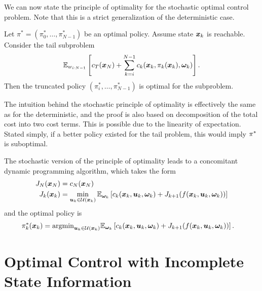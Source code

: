 We can now state the principle of optimality for the stochastic optimal control problem. Note that this is a strict generalization of the deterministic case. 

\begin{theorem}
Let $\pi^* = (\pi_0^*, \ldots, \pi^*_{N-1})$ be an optimal policy. Assume state $\bm{x}_k$ is reachable. Consider the tail subproblem
\begin{equation}
\mathbb{E}_{w_{i:N-1}}\left[ c_T(\bm{x}_N) + \sum_{k=i}^{N-1} c_k(\bm{x}_k,\pi_k(\bm{x}_k),\bm{\omega}_k) \right].
\end{equation}
Then the truncated policy $(\pi_i^*, \ldots, \pi^*_{N-1})$ is optimal for the subproblem.
\end{theorem}
The intuition behind the stochastic principle of optimality is effectively the same as for the deterministic, and the proof is also based on decomposition of the total cost into two cost terms. This is possible due to the linearity of expectation. Stated simply, if a better policy existed for the tail problem, this would imply $\pi^*$ is suboptimal. 

The stochastic version of the principle of optimality leads to a concomitant dynamic programming algorithm, which takes the form
\begin{align}
    J_N(\bm{x}_N) &= c_N(\bm{x}_N)\\
    J_k(\bm{x}_k) &= \min_{\bm{u}_k \in \mathcal{U}(\bm{x}_k)} \mathbb{E}_{\bm{\omega}_k} \left[ c_k(\bm{x}_k,\bm{u}_k,\bm{\omega}_k) + J_{k+1}(f(\bm{x}_k,\bm{u}_k,\bm{\omega}_k)) \right]
    \label{eq:DP_rec_stoch}
\end{align}
and the optimal policy is
\begin{align}
    \pi^*_k(\bm{x}_k) &= \text{argmin}_{\bm{u}_k \in \mathcal{U}(\bm{x}_k)} \mathbb{E}_{\bm{\omega}_k} \left[ c_k(\bm{x}_k,\bm{u}_k,\bm{\omega}_k) + J_{k+1}(f(\bm{x}_k,\bm{u}_k,\bm{\omega}_k)) \right].
    \label{eq:DP_rec_stoch}
\end{align}


\section{Optimal Control with Incomplete State Information}

